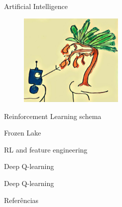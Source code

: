 \documentclass[10pt]{beamer}
\begin{document}
\nocite{Sutton98a}

\maketitle



\begin{frame}{Artificial Intelligence}

\begin{figure}[h]
\includegraphics[width=5cm]{images/robo.jpg}
\end{figure}
\end{frame}


\begin{frame}{Reinforcement Learning schema}

\end{frame}

\begin{frame}[fragile]{Frozen Lake}

\end{frame}

\begin{frame}[fragile]{RL and feature engineering}

\end{frame}

\begin{frame}[fragile]{Deep Q-learning}

\end{frame}

\begin{frame}[fragile]{Deep Q-learning}

\end{frame}


\begin{frame}[allowframebreaks]{Referências}

  
  

\end{frame}
\end{document}
